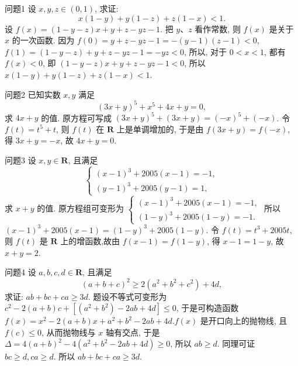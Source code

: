 
问题1 设 $x, y, z \in(0,1)$, 求证:
$$
x(1-y)+y(1-z)+z(1-x)<1 .
$$
设 $f(x)=(1-y-z) x+y+z-y z-1$. 把 $y 、 z$ 看作常数, 则 $f(x)$ 是关于 $x$ 的一次函数.
因为 $f(0)=y+z-y z-1=-(y-1)(z-1)<0$, $f(1)=(1-y-z)+y+z-y z-1=-y z<0$, 所以, 对于 $0<x<1$, 都有 $f(x)<0$, 即 $(1-y-z) x+y+z-y z-1<0$, 所以 $x(1-y)+y(1- z)+z(1-x)<1$.



问题2 已知实数 $x, y$ 满足
$$
(3 x+y)^5+x^5+4 x+y=0,
$$
求 $4 x+y$ 的值.
原方程可写成 $(3 x+y)^5+(3 x+y)=(-x)^5+(-x)$. 令 $f(t)= t^5+t$, 则 $f(t)$ 在 $\mathbf{R}$ 上是单调增加的, 于是由 $f(3 x+y)=f(-x)$, 得 $3 x+ y=-x$, 故 $4 x+y=0$.



问题3 设 $x, y \in \mathbf{R}$, 且满足
$$
\left\{\begin{array}{l}
(x-1)^3+2005(x-1)=-1, \\
(y-1)^3+2005(y-1)=1,
\end{array}\right.
$$
求 $x+y$ 的值.
原方程组可变形为 $\left\{\begin{array}{l}(x-1)^3+2005(x-1)=-1, \\ (1-y)^3+2005(1-y)=-1 .\end{array}\right.$ 所以 $(x-1)^3+ 2005(x-1)=(1-y)^3+2005(1-y)$. 令 $f(t)=t^3+2005 t$, 则 $f(t)$ 是 $\mathbf{R}$ 上的增函数,故由 $f(x-1)=f(1-y)$, 得 $x-1=1-y$, 故 $x+y=2$.



问题4 设 $a, b, c, d \in \mathbf{R}$, 且满足
$$
(a+b+c)^2 \geqslant 2\left(a^2+b^2+c^2\right)+4 d,
$$
求证: $a b+b c+c a \geqslant 3 d$.
题设不等式可变形为 $c^2-2(a+b) c+\left[\left(a^2+b^2\right)-2 a b+4 d\right] \leqslant 0$, 于是可构造函数 $f(x)=x^2-2(a+b) x+a^2+b^2-2 a b+4 d . f(x)$ 是开口向上的抛物线, 且 $f(c) \leqslant 0$, 从而抛物线与 $x$ 轴有交点, 于是 $\Delta=4(a+b)^2-4\left(a^2+\right. \left.b^2-2 a b+4 d\right) \geqslant 0$, 所以 $a b \geqslant d$. 同理可证 $b c \geqslant d, c a \geqslant d$. 所以 $a b+b c+ c a \geqslant 3 d$.



